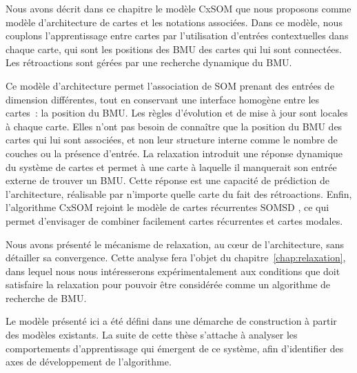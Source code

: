 \documentclass[../main]{subfiles}
\begin{document}
Nous avons décrit dans ce chapitre le modèle CxSOM que nous proposons comme modèle d'architecture de cartes et les notations associées.
Dans ce modèle, nous couplons l'apprentissage entre cartes par l'utilisation d'entrées contextuelles dans chaque carte, qui sont les positions des BMU des cartes qui lui sont connectées. Les rétroactions sont gérées par une recherche dynamique du BMU.

Ce modèle d'architecture permet l'association de SOM prenant des entrées de dimension différentes, tout en conservant une interface homogène entre les cartes~: la position du BMU.
Les règles d'évolution et de mise à jour sont locales à chaque carte. Elles n'ont pas besoin de connaître que la position du BMU des cartes qui lui sont associées, et non leur structure interne comme le nombre de couches ou la présence d'entrée. La relaxation introduit une réponse dynamique du système de cartes et permet à une carte à laquelle il manquerait son entrée externe de trouver un BMU. Cette réponse est une capacité de prédiction de l'architecture, réalisable par n'importe quelle carte du fait des rétroactions.
Enfin, l'algorithme CxSOM rejoint le modèle de cartes récurrentes SOMSD \parencite{hammer_recursive_2004}, ce qui permet d'envisager de combiner facilement cartes récurrentes et cartes modales.

Nous avons présenté le mécanisme de relaxation, au c\oe{}ur de l'architecture, sans détailler sa convergence. Cette analyse fera l'objet du chapitre~\ref{chap:relaxation}, dans lequel nous nous intéresserons expérimentalement aux conditions que doit satisfaire la relaxation pour pouvoir être considérée comme un algorithme de recherche de BMU.

Le modèle présenté ici a été défini dans une démarche de construction à partir des modèles existants.
La suite de cette thèse s'attache à analyser les comportements d'apprentissage qui émergent de ce système, afin d'identifier des axes de développement de l'algorithme.
\end{document}

